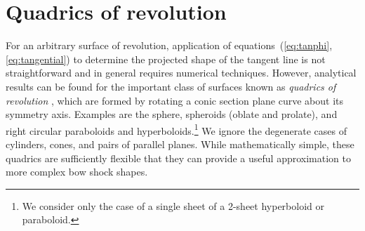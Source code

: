 \section{Quadrics of revolution}
\label{sec:conic}

\newcommand\Sin{\ensuremath{\mathcal{S}}}
\newcommand\Cos{\ensuremath{\mathcal{C}}}
\newcommand\Cot{\ensuremath{\mathcal{T}}}

For an arbitrary surface of revolution, application of
equations~(\ref{eq:tanphi}, \ref{eq:tangential}) to determine the
projected shape of the tangent line is not straightforward and in
general requires numerical techniques.  However, analytical results
can be found for the important class of surfaces known as
\textit{quadrics of revolution} \citep{Goldman:1983a, Gfrerrer:2009a},
which are formed by rotating a conic section plane curve about its
symmetry axis.  Examples are the sphere, spheroids (oblate and
prolate), and right circular paraboloids and hyperboloids.\footnote{We
  consider only the case of a single sheet of a 2-sheet hyperboloid or
  paraboloid.}  We ignore the degenerate cases of cylinders, cones,
and pairs of parallel planes.  While mathematically simple, these
quadrics are sufficiently flexible that they can provide a useful
approximation to more complex bow shock shapes. 


